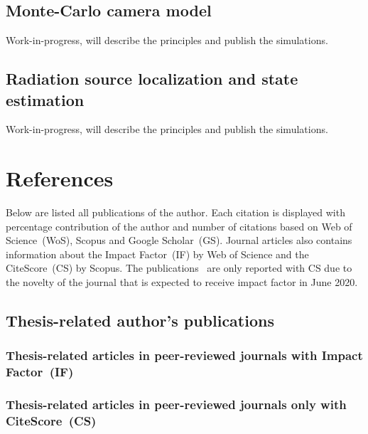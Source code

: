 \documentclass[a4paper,11pt,titlepage,twoside]{book}
\newcommand{\chapternoclear}[1]{
  \begingroup
  \let\cleardoublepage\clearpage
  \chapter{#1}
  \endgroup
}
\begin{document}
\section{Monte-Carlo camera model}

Work-in-progress, will describe the principles and publish the simulations.

\section{Radiation source localization and state estimation}

Work-in-progress, will describe the principles and publish the simulations.



\appendix
\renewcommand\chaptername{Appendix}

\chapternoclear{References}

Below are listed all publications of the author.
Each citation is displayed with percentage contribution of the author and number of citations based on Web of Science~(WoS), Scopus and Google Scholar~(GS).
Journal articles also contains information about the Impact Factor~(IF) by Web of Science and the CiteScore~(CS) by Scopus.
The publications~\cite{loianno2018localization, petrlik2020robust, stibinger2020localization} are only reported with CS due to the novelty of the journal that is expected to receive impact factor in June 2020.

\section{Thesis-related author's publications}

\subsection*{Thesis-related articles in peer-reviewed journals with Impact Factor~(IF)}
\printbibliography[keyword={mine},keyword={phd_related},keyword={journal},keyword={if},heading=none,title={}]

\subsection*{Thesis-related articles in peer-reviewed journals only with CiteScore~(CS)}
\printbibliography[keyword={mine},keyword={phd_related},keyword={journal},keyword={cs},heading=none,title={}]
\end{document}
